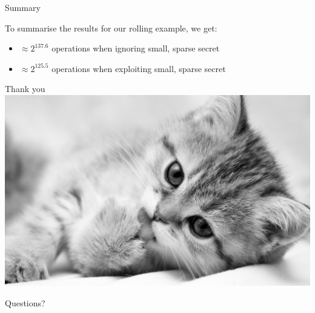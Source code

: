 \documentclass[10pt,compress]{beamer}
\begin{document}
\begin{frame}{Summary}

  To summarise the results for our rolling example, we get:
  
  \begin{itemize}
  \item $≈ 2^{137.6}$ operations when ignoring small, sparse secret
  \item $≈ 2^{125.5}$ operations when exploiting small, sparse secret 
  \end{itemize}

\end{frame}

\begin{frame}{Thank you}
  \centering
  \includegraphics[width=1.0\textwidth]{kitten-01.jpg}

  \alert{\Large Questions?}
  

\end{frame}
\end{document}
